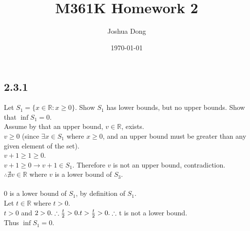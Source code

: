 \documentclass{article}
\begin{document}
\title{M361K\: Homework 2}
\author{Joshua Dong}
\date{\today}
\maketitle

\subsection{2.3.1}
Let $S_1 = \{x \in \mathbb{R}: x \ge 0\}$. Show $S_1$ has lower bounds, but
no upper bounds. Show that $\inf{S_1} = 0$.
\\Assume by that an upper bound, $v \in \mathbb{R}$, exists.
\\$v \ge 0$ (since $\exists x \in S_1$ where $x \ge 0$, and an upper bound
must be greater than any given element of the set).
\\$v+1 \ge 1 \ge 0$.
\\$v+1 \ge 0 \rightarrow v+1 \in S_1$. Therefore $v$ is not an upper bound,
contradiction.
\\$\therefore \nexists v \in \mathbb{R}$ where $v$ is a lower bound of
$S_3$. 
\\
\\0 is a lower bound of $S_1$, by definition of $S_1$.
\\Let $t \in \mathbb{R}$ where $t > 0$.
\\$t > 0$ and $2 > 0.
\\\therefore \frac{t}{2} > 0.
\\t > \frac{t}{2} > 0.
\\\therefore$ t is not a lower bound.
\\Thus $\inf{S_1} = 0$.
\end{document}
